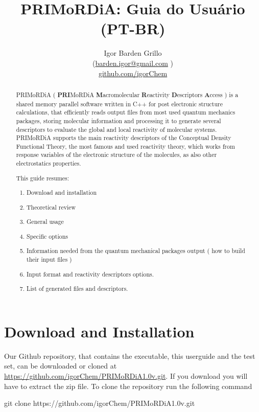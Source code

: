 \documentclass[a4paper,11pt]{refart}
\title{PRIMoRDiA: Guia do Usuário (PT-BR) }
\author{Igor Barden Grillo \\(\url{barden.igor@gmail.com} )\\\url{github.com/igorChem}}
\begin{document}
\maketitle

\begin{abstract}
PRIMoRDiA ( \textbf{PRI}MoRDiA \textbf{M}acromolecular \textbf{R}eactivity \textbf{D}escriptors \textbf{A}ccess ) is a shared memory parallel software written in C++ for post electronic structure calculations, that efficiently reads output files from most used quantum mechanics packages, storing molecular information and processing it to generate several descriptors to evaluate the global and local reactivity of molecular systems. PRIMoRDiA supports the main reactivity descriptors of the Conceptual Density Functional Theory, the most famous and used reactivity theory, which works from response variables of the electronic structure of the molecules, as also other electrostatics properties.

This guide resumes: 
\begin{enumerate}
	\item Download and installation
	\item Theoretical review
	\item General usage
	\item Specific options
	\item Information needed from the quantum mechanical packages output ( how to build their input files )
	\item Input format and reactivity descriptors options.
	\item List of generated files and descriptors.
\end{enumerate}

\end{abstract}
\newpage
\tableofcontents
\newpage


\section{Download and Installation}

Our Github repository, that contains the executable, this userguide and the test set, can be downloaded or cloned at \url{https://github.com/igorChem/PRIMoRDiA1.0v.git}. If you download you will have to extract the zip file. To clone the repository run the following command

\hspace*{-\leftmarginwidth}
\begin{minipage}{\fullwidth}
	\begin{commandshell}git clone https://github.com/igorChem/PRIMoRDiA1.0v.git\end{commandshell}
\end{minipage}
\end{document}

